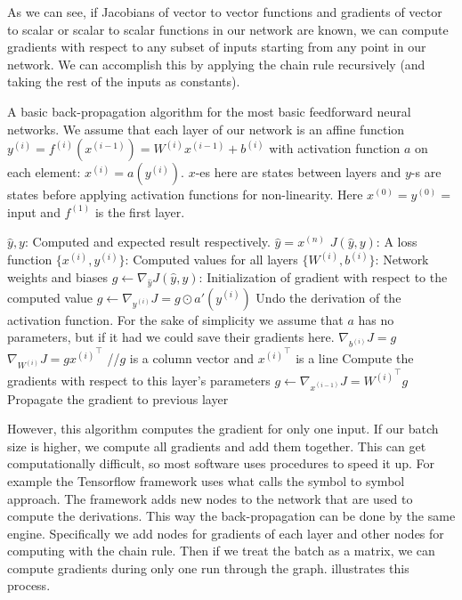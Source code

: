 As we can see, if Jacobians of vector to vector functions and gradients of vector to scalar or scalar to scalar functions in our network are known, we can compute gradients with respect to any subset of inputs starting from any point in our network. We can accomplish this by applying the chain rule recursively (and taking the rest of the inputs as constants).

\begin{algorithm}[h]
\caption{A basic back-propagation algorithm for the most basic feedforward neural networks. We assume that each layer of our network is an affine function $y^{(i)}=f^{(i)}(x^{(i-1)})=W^{(i)}x^{(i-1)}+b^{(i)}$ with activation function $a$ on each element: $x^{(i)}=a(y^{(i)})$. $x$-es here are states between layers and $y$-s are states before applying activation functions for non-linearity. Here $x^{(0)}=y^{(0)}=$ input and $f^{(1)}$ is the first layer.}
\begin{algorithmic}
\REQUIRE $\widehat{y},y$: Computed and expected result respectively. $\widehat{y}=x^{(n)}$
\REQUIRE $J(\widehat{y},y)$: A loss function
\REQUIRE $\{x^{(i)},y^{(i)}\}$: Computed values for all layers 
\REQUIRE $\{W^{(i)},b^{(i)}\}$: Network weights and biases
\STATE $g\leftarrow \nabla_{\hat{y}}J(\widehat{y},y)$: Initialization of gradient with respect to the computed value
	\STATE $g\leftarrow \nabla_{y^{(i)}}J=g\odot a'(y^{(i)})$
	\STATE Undo the derivation of the activation function. For the sake of simplicity we assume that $a$ has no parameters, but if it had we could save their gradients here.
	\STATE 
	\STATE $\nabla_{b^{(i)}}J=g$
	\STATE $\nabla_{W^{(i)}}J=g{x^{(i)}}^\top$ //$g$ is a column vector and ${x^{(i)}}^\top$ is a line
	\STATE Compute the gradients with respect to this layer's parameters
	\STATE
	\STATE $g\leftarrow \nabla_{x^{(i-1)}}J={W^{(i)}}^\top g$
	\STATE Propagate the gradient to previous layer
\ENDFOR
\end{algorithmic}
\end{algorithm}

However, this algorithm computes the gradient for only one input. If our batch size is higher, we compute all gradients and add them together. This can get computationally difficult, so most software uses procedures to speed it up. For example the Tensorflow framework uses what \cite{neural} calls the symbol to symbol approach. The framework adds new nodes to the network that are used to compute the derivations. This way the back-propagation can be done by the same engine. Specifically we add nodes for gradients of each layer and other nodes for computing with the chain rule. Then if we treat the batch as a matrix, we can compute gradients during only one run through the graph.  illustrates this process.


